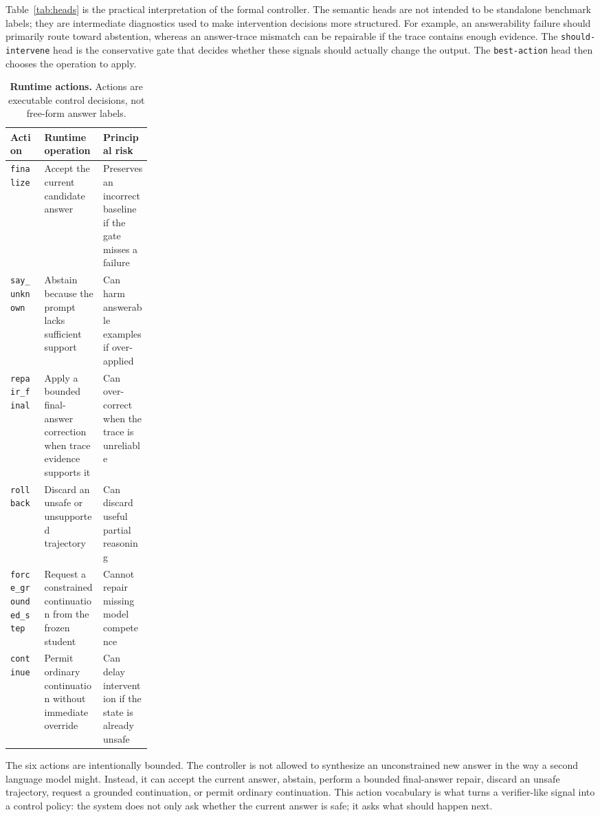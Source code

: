 \documentclass[11pt]{article}
\begin{document}
Table~\ref{tab:heads} is the practical interpretation of the formal controller. The semantic heads are not intended to be standalone benchmark labels; they are intermediate diagnostics used to make intervention decisions more structured. For example, an answerability failure should primarily route toward abstention, whereas an answer-trace mismatch can be repairable if the trace contains enough evidence. The \texttt{should-intervene} head is the conservative gate that decides whether these signals should actually change the output. The \texttt{best-action} head then chooses the operation to apply.

\begin{table}[H]
\centering
\small
\caption{\textbf{Runtime actions.} Actions are executable control decisions, not free-form answer labels.}
\label{tab:actions}
\begin{tabularx}{\linewidth}{p{0.24\linewidth}Y Y}
\toprule
Action & Runtime operation & Principal risk \\
\midrule
\texttt{finalize} & Accept the current candidate answer & Preserves an incorrect baseline if the gate misses a failure \\
\texttt{say\_unknown} & Abstain because the prompt lacks sufficient support & Can harm answerable examples if over-applied \\
\texttt{repair\_final} & Apply a bounded final-answer correction when trace evidence supports it & Can over-correct when the trace is unreliable \\
\texttt{rollback} & Discard an unsafe or unsupported trajectory & Can discard useful partial reasoning \\
\texttt{force\_grounded\_step} & Request a constrained continuation from the frozen student & Cannot repair missing model competence \\
\texttt{continue} & Permit ordinary continuation without immediate override & Can delay intervention if the state is already unsafe \\
\bottomrule
\end{tabularx}
\end{table}

The six actions are intentionally bounded. The controller is not allowed to synthesize an unconstrained new answer in the way a second language model might. Instead, it can accept the current answer, abstain, perform a bounded final-answer repair, discard an unsafe trajectory, request a grounded continuation, or permit ordinary continuation. This action vocabulary is what turns a verifier-like signal into a control policy: the system does not only ask whether the current answer is safe; it asks what should happen next.
\end{document}

